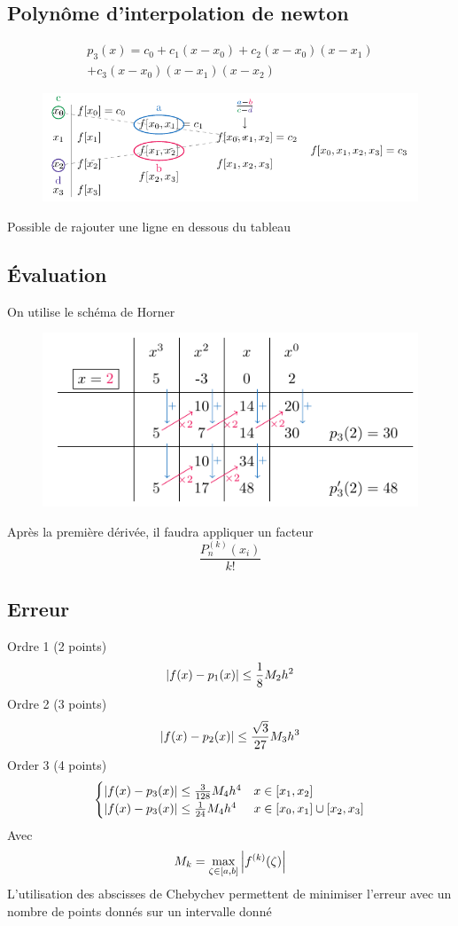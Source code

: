 \documentclass[resume]{subfiles}
\begin{document}
    \subsection{Polynôme d'interpolation de newton}
    \begin{multline*}
    p_3(x)=c_0+c_1(x-x_0) +c_2(x-x_0)(x-x_1)\\ +c_3(x-x_0)(x-x_1)(x-x_2)
    \end{multline*}
    \begin{figure}[H]
        \centering
        \includegraphics[width=\columnwidth]{drwg_3.pdf}
    \end{figure}
    Possible de rajouter une ligne en dessous du tableau
    
    \subsection{Évaluation}
    On utilise le schéma de Horner
    \begin{figure}[H]
        \centering
        \includegraphics[width=0.8\columnwidth]{drwg_4.pdf}
    \end{figure}
    Après la première dérivée, il faudra appliquer un facteur
    $$\frac{P_n^{(k)}(x_i)}{k!}$$
    \subsection{Erreur}
    Ordre 1 (2 points)
    $$\abs{f(x)-p_1(x)}\leq \frac{1}{8}M_2h^2$$
    Ordre 2 (3 points)
    $$\abs{f(x)-p_2(x)}\leq \frac{\sqrt{3}}{27}M_3h^3$$
    Order 3 (4 points)
    $$\begin{cases}
        \abs{f(x)-p_3(x)}\leq \frac{3}{128}M_4h^4 & x\in[x_1,x_2]\\
        \abs{f(x)-p_3(x)}\leq \frac{1}{24}M_4h^4  & x\in[x_0,x_1] \cup [x_2,x_3]
    \end{cases}$$
    Avec
    $$M_{k}=\max_{\zeta\in[a,b]}\abs{f^{(k)}(\zeta)}$$
    L'utilisation des abscisses de Chebychev permettent de minimiser l'erreur avec un nombre de points donnés sur un intervalle donné
\end{document}
